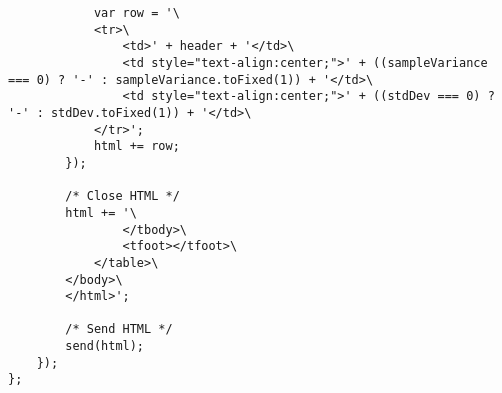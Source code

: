 \begin{verbatim}
            var row = '\
            <tr>\
                <td>' + header + '</td>\
                <td style="text-align:center;">' + ((sampleVariance === 0) ? '-' : sampleVariance.toFixed(1)) + '</td>\
                <td style="text-align:center;">' + ((stdDev === 0) ? '-' : stdDev.toFixed(1)) + '</td>\
            </tr>';
            html += row;
        });

        /* Close HTML */
        html += '\
                </tbody>\
                <tfoot></tfoot>\
            </table>\
        </body>\
        </html>';

        /* Send HTML */
        send(html);
    });
};
\end{verbatim}